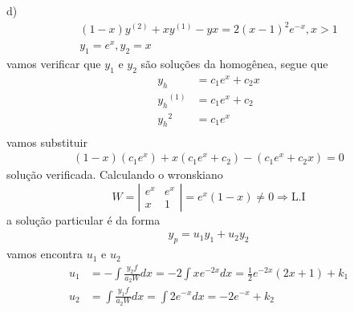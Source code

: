 \documentclass[a4paper,12pt]{article}
\begin{document}
d)
\begin{align*}
	(1 - x)y^{(2)} + xy^{(1)} - yx  = 2{(x -1)}^{2}e^{-x}, x > 1 \\
	y_1 = e^{x}, y_2 = x
\end{align*}
vamos verificar que $y_1$ e $y_2$ s\~ao solu\c c\~oes da homog\^enea, segue que 
\begin{align*}
	y_h &= c_1 e^{x} + c_2 x \\
	{y_h}^{(1)} &= c_1 e^{x} + c_2  \\
	{y_h}^{2} &= c_1 e^{x}  \\
\end{align*}
vamos substituir 
\begin{align*}
	(1 - x)(c_1 e^{x}) + x(c_1 e^{x} + c_2) - (c_1 e^{x} + c_2 x) = 0
\end{align*}
solu\c c\~ao verificada. Calculando o wronskiano
\[ W = 
\left | 
\begin{array}{cc}
	e^{x} & e^{x} \\
	x & 1
\end{array} 
\right | = e^{x}(1 - x) \neq 0 \Rightarrow \mbox{L.I}
\]
a solu\c c\~ao particular \'e da forma 
\begin{align*}
	y_p = u_1 y_1 + u_2 y_2 
\end{align*}
vamos encontra $u_1$ e $u_2$
\begin{align*}
	u_1 &= -\int \frac{y_2 f}{a_2 W} dx = -2 \int xe^{-2x} dx =  \frac{1}{2} e^{-2x} (2x + 1) + k_1 \\
	u_2 &= \int \frac{y_1 f}{a_2 W} dx = \int 2 e^{-x} dx = -2 e^{-x} + k_2
\end{align*}
\end{document}

